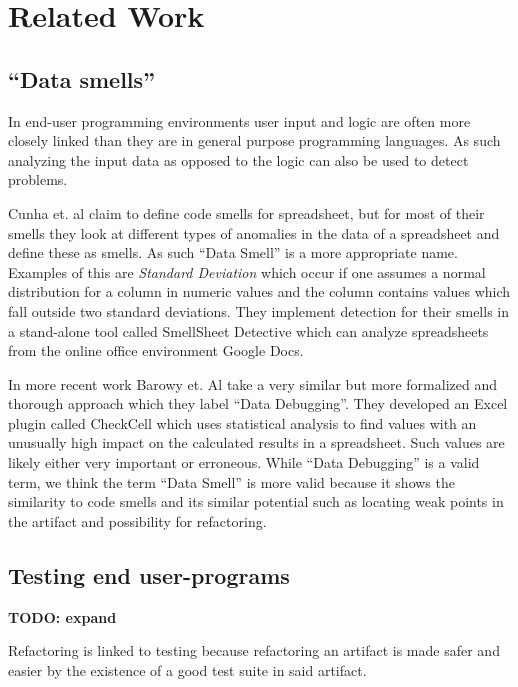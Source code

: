 \documentclass[10pt,conference,compsocconf]{IEEEtran}
\newcommand{\todo}[1]{\textbf{TODO: #1}}
\begin{document}
\section{Related Work}
\label{sec:related_work}

\subsection{``Data smells''}
\label{subsec:related_datasmells}

In end-user programming environments user input and logic are often more closely linked than they are in general purpose programming languages.
As such analyzing the input data as opposed to the logic can also be used to detect problems.

Cunha et. al \cite{cunha2012towards} claim to define code smells for spreadsheet, but for most of their smells they look at different types of anomalies in the data of a spreadsheet and define these as smells.
As such ``Data Smell'' is a more appropriate name.
Examples of this are \textit{Standard Deviation} which occur if one assumes a normal distribution for a column in numeric values and the column contains values which fall outside two standard deviations.
They implement detection for their smells in a stand-alone tool called SmellSheet Detective which can analyze spreadsheets from the online office environment Google Docs.

In more recent work Barowy et. Al \cite{barowy2014checkcell} take a very similar but more formalized and thorough approach which they label ``Data Debugging''.
They developed an Excel plugin called CheckCell which uses statistical analysis to find values with an unusually high impact on the calculated results in a spreadsheet.
Such values are likely either very important or erroneous.
While ``Data Debugging'' is a valid term, we think the term ``Data Smell'' is more valid because it shows the similarity to code smells and its similar potential such as locating weak points in the artifact and possibility for refactoring.

\subsection{Testing end user-programs}

\todo{expand}

Refactoring is linked to testing because refactoring an artifact is made safer and easier by the existence of a good test suite in said artifact.
\end{document}
